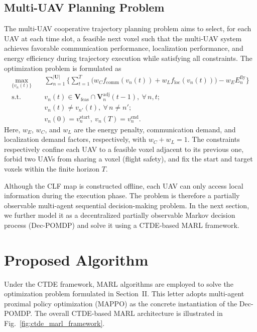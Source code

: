 \documentclass[lettersize,journal]{IEEEtran}
\begin{document}
\subsection{Multi-UAV Planning Problem}

The multi-UAV cooperative trajectory planning problem aims to select, for each UAV at each time slot, a feasible next voxel such that the multi-UAV system achieves favorable communication performance, localization performance, and energy efficiency during trajectory execution while satisfying all constraints. The optimization problem is formulated as
\begin{equation}
\begin{aligned}
\max_{\{v_n(t)\}}\quad &
\sum_{n=1}^{|\mathbf{U}|}\Big\{\sum_{t=1}^{T}\big(w_Cf_{\mathrm{comm}}(v_n(t))
+w_Lf_{\mathrm{loc}}(v_n(t))\big)-w_EE_n^{\mathrm{fly}}\Big\}\\
\mathrm{s.t.}\quad & v_n(t)\in\mathbf{V}_{\mathrm{feas}}\cap\mathbf{V}_n^{\mathrm{adj}}(t-1),\ \forall\,n,t;\\
& v_n(t)\neq v_{n'}(t),\ \forall\,n\neq n';\\
& v_n(0)=v_n^{\mathrm{start}},\ v_n(T)=v_n^{\mathrm{end}}.
\end{aligned}
\end{equation}
Here, $w_E$, $w_C$, and $w_L$ are the energy penalty, communication demand, and localization demand factors, respectively, with $w_C+w_L=1$. The constraints respectively confine each UAV to a feasible voxel adjacent to its previous one, forbid two UAVs from sharing a voxel (flight safety), and fix the start and target voxels within the finite horizon $T$.

Although the CLF map is constructed offline, each UAV can only access local information during the execution phase. The problem is therefore a partially observable multi-agent sequential decision-making problem. In the next section, we further model it as a decentralized partially observable Markov decision process (Dec-POMDP) and solve it using a CTDE-based MARL framework.

\section{Proposed Algorithm}

Under the CTDE framework, MARL algorithms are employed to solve the optimization problem formulated in Section~II. This letter adopts multi-agent proximal policy optimization (MAPPO) as the concrete instantiation of the Dec-POMDP. The overall CTDE-based MARL architecture is illustrated in Fig.~\ref{fig:ctde_marl_framework}.
\end{document}
